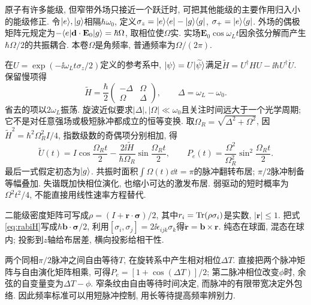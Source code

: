 \label{ch:res}
原子有许多能级, 但窄带外场只接近一个跃迁时, 可把其他能级的主要作用归入小的能级修正. 令$\lvert e\rangle,\lvert g\rangle$相隔$\hbar\omega_0$, 定义$\sigma_z=\lvert e\rangle\langle e\rvert-\lvert g\rangle\langle g\rvert$, $\sigma_+=\lvert e\rangle\langle g\rvert$. 外场的偶极矩阵元规定为$-\langle e\rvert\mathbf d\cdot\mathbf E_0\lvert g\rangle=\hbar\Omega$, 取相位使$\Omega$实. 实场$\mathbf E_0\cos\omega_Lt$因余弦分解而产生$\hbar\Omega/2$的共振耦合. 本卷$\Omega$是角频率, 普通频率为$\Omega/(2\pi)$.

在$U=\exp(-\ii\omega_Lt\sigma_z/2)$定义的参考系中, $\lvert \psi\rangle=U\lvert \widetilde\psi\rangle$满足$\widetilde H=U^\dagger HU-\ii\hbar U^\dagger\dot U$. 保留慢项得
\begin{equation}\widetilde H=\frac{\hbar}{2}\begin{pmatrix}-\Delta&\Omega\\\Omega&\Delta\end{pmatrix},\qquad\Delta=\omega_L-\omega_0.\label{eq:rabiH}\end{equation}
省去的项以$2\omega_L$振荡. 旋波近似要求$|\Delta|,|\Omega|\ll\omega_0$且关注时间远大于一个光学周期; 它不是对任意强场或极短脉冲都成立的恒等变换. 取$\Omega_R=\sqrt{\Delta^2+\Omega^2}$, 因$\widetilde H^2=\hbar^2\Omega_R^2I/4$, 指数级数的奇偶项分别相加, 得
\begin{equation}\widetilde U(t)=I\cos\frac{\Omega_Rt}{2}-\frac{2\ii\widetilde H}{\hbar\Omega_R}\sin\frac{\Omega_Rt}{2},\qquad P_e(t)=\frac{\Omega^2}{\Omega_R^2}\sin^2\frac{\Omega_Rt}{2}.\label{eq:rabi}\end{equation}
最后一式假定初态为$\lvert g\rangle$. 共振时面积$\int\Omega(t)\dd t=\pi$的脉冲翻转布居; $\pi/2$脉冲制备等幅叠加. 失谐既加快相位演化, 也缩小可达的激发布居. 弱驱动的短时概率为$\Omega^2t^2/4$, 不能直接用线性速率方程替代.

二能级密度矩阵可写成$\rho=(I+\mathbf r\cdot\boldsymbol\sigma)/2$, 其中$r_i=\operatorname{Tr}(\rho\sigma_i)$是实数, $|\mathbf r|\le1$. 把式\eqref{eq:rabiH}写成$\hbar\mathbf b\cdot\boldsymbol\sigma/2$, 利用$[\sigma_i,\sigma_j]=2\ii\epsilon_{ijk}\sigma_k$得$\dot{\mathbf r}=\mathbf b\times\mathbf r$. 纯态在球面, 混态在球内; 投影到$z$轴给布居差, 横向投影给相干性.

两个同相$\pi/2$脉冲之间自由等待$T$, 在旋转系中产生相对相位$\Delta T$. 直接把两个脉冲矩阵与自由演化矩阵相乘, 可得$P_e=[1+\cos(\Delta T)]/2$; 第二脉冲相位改变$\phi$时, 余弦的自变量变为$\Delta T-\phi$. 窄条纹由自由等待时间决定, 而脉冲的有限带宽决定外包络. 因此频率标准可以用短脉冲控制, 用长等待提高频率辨别力.

